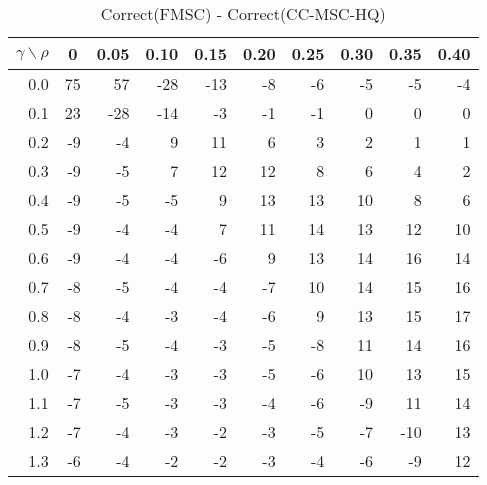 \documentclass[12pt]{article}
\begin{document}
%

\begin{table}[!tbp]
\caption{Correct(FMSC) - Correct(CC-MSC-HQ)}
 \begin{center}
 \begin{tabular}{r|rrrrrrrrr}\hline\hline
\multicolumn{1}{c|}{$\gamma\backslash\rho$}&\multicolumn{1}{c}{0}&\multicolumn{1}{c}{0.05}&\multicolumn{1}{c}{0.10}&\multicolumn{1}{c}{0.15}&\multicolumn{1}{c}{0.20}&\multicolumn{1}{c}{0.25}&\multicolumn{1}{c}{0.30}&\multicolumn{1}{c}{0.35}&\multicolumn{1}{c}{0.40}\tabularnewline
\hline


0.0&75& 57&-28&-13&-8&-6&-5& -5&-4\tabularnewline
0.1&23&-28&-14& -3&-1&-1& 0&  0& 0\tabularnewline
0.2&-9& -4&  9& 11& 6& 3& 2&  1& 1\tabularnewline
0.3&-9& -5&  7& 12&12& 8& 6&  4& 2\tabularnewline
0.4&-9& -5& -5&  9&13&13&10&  8& 6\tabularnewline
0.5&-9& -4& -4&  7&11&14&13& 12&10\tabularnewline
0.6&-9& -4& -4& -6& 9&13&14& 16&14\tabularnewline
0.7&-8& -5& -4& -4&-7&10&14& 15&16\tabularnewline
0.8&-8& -4& -3& -4&-6& 9&13& 15&17\tabularnewline
0.9&-8& -5& -4& -3&-5&-8&11& 14&16\tabularnewline
1.0&-7& -4& -3& -3&-5&-6&10& 13&15\tabularnewline
1.1&-7& -5& -3& -3&-4&-6&-9& 11&14\tabularnewline
1.2&-7& -4& -3& -2&-3&-5&-7&-10&13\tabularnewline
1.3&-6& -4& -2& -2&-3&-4&-6& -9&12\tabularnewline
\hline
\end{tabular}

\end{center}

\end{table}
\end{document}
